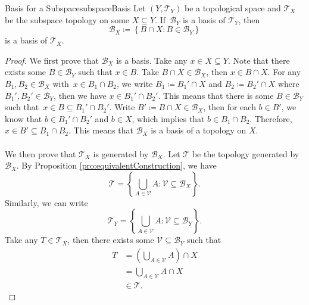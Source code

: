 \documentclass[math]{amznotes}
\theoremstyle{remark}
\begin{document}
\begin{probox}{Basis for a Subspace}{subspaceBasis}
    Let $\left(Y, \mathcal{T}_Y\right)$ be a topological space and $\mathcal{T}_X$ be the subspace topology on some $X \subseteq Y$. If~$\mathcal{B}_Y$ is a basis of $\mathcal{T}_Y$, then 
    \begin{equation*}
        \mathcal{B}_X \coloneqq \left\{B \cap X \colon B \in \mathcal{B}_Y\right\}
    \end{equation*}
    is a basis of $\mathcal{T}_X$.
    \tcblower
    \begin{proof}
        We first prove that $\mathcal{B}_X$ is a basis. Take any $x \in X \subseteq Y$. Note that there exists some $B \in \mathcal{B}_Y$ such that $x \in B$. Take $B \cap X \in \mathcal{B}_X$, then $x \in B \cap X$. For any $B_1, B_2 \in \mathcal{B}_X$ with~$x \in B_1 \cap B_2$, we write $B_1 \coloneqq B_1' \cap X$ and $B_2 \coloneqq B_2' \cap X$ where $B_1', B_2' \in \mathcal{B}_Y$, then we have $x \in B_1' \cap B_2'$. This means that there is some $B \in \mathcal{B}_Y$ such that~$x \in B \subseteq B_1' \cap B_2'$. Write $B' \coloneqq B \cap X \in \mathcal{B}_X$, then for each $b \in B'$, we know that $b \in B_1' \cap B_2'$ and $b \in X$, which implies that $b \in B_1 \cap B_2$. Therefore, $x \in B' \subseteq B_1 \cap B_2$. This means that $\mathcal{B}_X$ is a basis of a topology on $X$. 
        \\\\
        We then prove that $\mathcal{T}_X$ is generated by $\mathcal{B}_X$. Let $\mathcal{T}$ be the topology generated by~$\mathcal{B}_X$. By Proposition \ref{pro:equivalentConstruction}, we have 
        \begin{equation*}
            \mathcal{T} = \left\{\bigcup_{A \in \mathcal{V}}A \colon \mathcal{V} \subseteq \mathcal{B}_X\right\}.
        \end{equation*}
        Similarly, we can write 
        \begin{equation*}
            \mathcal{T}_Y = \left\{\bigcup_{A \in \mathcal{V}}A \colon \mathcal{V} \subseteq \mathcal{B}_Y\right\}.
        \end{equation*}
        Take any $T \in \mathcal{T}_X$, then there exists some $\mathcal{V} \subseteq \mathcal{B}_Y$ such that
        \begin{align*}
            T & = \left(\bigcup_{A \in \mathcal{V}}A\right) \cap X \\
            & = \bigcup_{A \in \mathcal{V}}A \cap X \\
            & \in \mathcal{T}.

\end{align*}
\end{proof}
\end{probox}
\end{document}
